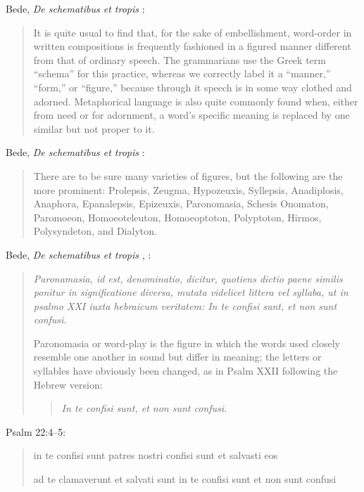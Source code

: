 \documentclass{article}
\begin{document}
Bede, {\em De schematibus et tropis} \cite[p.~240]{tanenhaus}:

\begin{quote}
It is quite usual to find that, for the
sake of embellishment, word-order in
written compositions is frequently
fashioned in a figured manner different
from that of ordinary speech. The grammarians use the Greek term ``schema''
for this practice, whereas we correctly
label it a ``manner,'' ``form,'' or ``figure,''
because through it speech is in some way
clothed and adorned. Metaphorical language is also quite commonly found
when, either from need or for adornment, a word's specific meaning is replaced by one similar but not proper to
it.
\end{quote}

Bede, {\em De schematibus et tropis} \cite[p.~240]{tanenhaus}:

\begin{quote}
There are to be sure many varieties of figures, but the following are the more prominent: Prolepsis, Zeugma, Hypozeuxis, Syllepsis, Anadiplosis, Anaphora, Epanalepsis, Epizeuxis, Paronomasia, Schesis Onomaton, Paromoeon, Homoeoteleuton, Homoeoptoton, Polyptoton, Hirmos, Polysyndeton, and Dialyton.
\end{quote}

Bede, {\em De schematibus et tropis} \cite[p.~609]{RLM}, \cite[p.~242]{tanenhaus}:

\begin{quote}
{\em Paronamasia, id est, denominatio, dicitur, quotiens dictio paene similis
ponitur in significatione diversa, mutata videlicet littera vel syllaba, ut
in psalmo XXI iuxta hebraicum veritatem: In te confisi sunt, et non
sunt confusi.}

Paronomasia or word-play is the figure
in which the words used closely resemble
one another in sound but differ
in meaning; the letters or syllables have
obviously been changed, as in Psalm
XXII following the Hebrew version:
\begin{quote}
{\em In te confisi sunt, et non sunt confusi.}
\end{quote}
\end{quote}

Psalm 22:4--5:

\begin{quote}
in te confisi sunt patres nostri confisi sunt et salvasti eos

ad te clamaverunt et salvati sunt in te confisi sunt et non sunt confusi
\end{quote}
\end{document}
